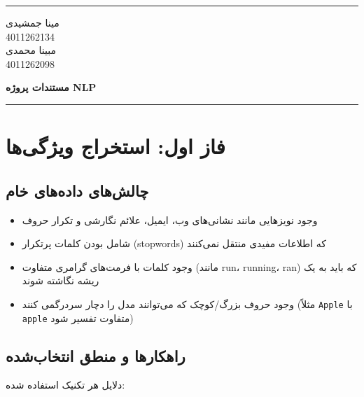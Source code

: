 \documentclass[a4paper,12pt]{article}
\newcommand{\StudentOne}{4011262134}
\newcommand{\StudentTwo}{4011262098}
\newcommand{\NameOne}{مینا جمشیدی}
\newcommand{\NameTwo}{مبینا محمدی}
\newcommand{\ProjectName}{مستندات پروژه NLP}
\let\nobreaksection\section
\renewcommand{\section}{\nobreaksection}
\begin{document}
	

	\hrule \medskip
	\begin{minipage}{0.3\textwidth}
		\raggedright
		\small
		\NameOne \\
		\StudentOne \\
		\NameTwo \\
		\StudentTwo
	\end{minipage}
	\begin{minipage}{0.4\textwidth} 
		\centering 
		\large\bfseries
		\ProjectName \\
	\end{minipage}
	\begin{minipage}{0.3\textwidth}
		\raggedleft
		\small
	\end{minipage}
	\medskip\hrule 
	\vspace*{1.5cm}  
	

\section{فاز اول: استخراج ویژگی‌ها}

	
	\subsection{چالش‌های داده‌های خام}
	\begin{itemize}
		\item وجود نویزهایی مانند نشانی‌های وب، ایمیل، علائم نگارشی و تکرار حروف
		\item شامل بودن کلمات پرتکرار (stopwords) که اطلاعات مفیدی منتقل نمی‌کنند
		\item وجود کلمات با فرمت‌های گرامری متفاوت (مانند run، running، ran) که باید به یک ریشه نگاشته شوند
		\item وجود حروف بزرگ/کوچک که می‌توانند مدل را دچار سردرگمی کنند (مثلاً \texttt{Apple} با \texttt{apple} متفاوت تفسیر شود)
	\end{itemize}
	
	\subsection{راهکارها و منطق انتخاب‌شده}
دلایل هر تکنیک استفاده شده:
	
\end{document}
